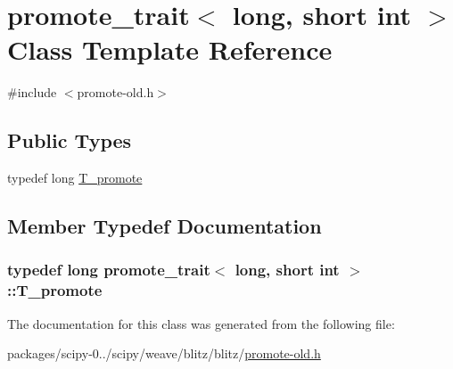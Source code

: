 \hypertarget{classpromote__trait_3_01long_00_01short_01int_01_4}{}\section{promote\+\_\+trait$<$ long, short int $>$ Class Template Reference}
\label{classpromote__trait_3_01long_00_01short_01int_01_4}


{\ttfamily \#include $<$promote-\/old.\+h$>$}

\subsection*{Public Types}
\begin{DoxyCompactItemize}
\item 
typedef long \hyperlink{classpromote__trait_3_01long_00_01short_01int_01_4_aa10645fb5efeb15a4fc429def857160b}{T\+\_\+promote}
\end{DoxyCompactItemize}


\subsection{Member Typedef Documentation}
\hypertarget{classpromote__trait_3_01long_00_01short_01int_01_4_aa10645fb5efeb15a4fc429def857160b}{}
\subsubsection[{T\+\_\+promote}]{\setlength{\rightskip}{0pt plus 5cm}typedef long {\bf promote\+\_\+trait}$<$ long, short int $>$\+::{\bf T\+\_\+promote}}\label{classpromote__trait_3_01long_00_01short_01int_01_4_aa10645fb5efeb15a4fc429def857160b}


The documentation for this class was generated from the following file\+:\begin{DoxyCompactItemize}
\item 
packages/scipy-\/0../scipy/weave/blitz/blitz/\hyperlink{promote-old_8h}{promote-\/old.\+h}\end{DoxyCompactItemize}
